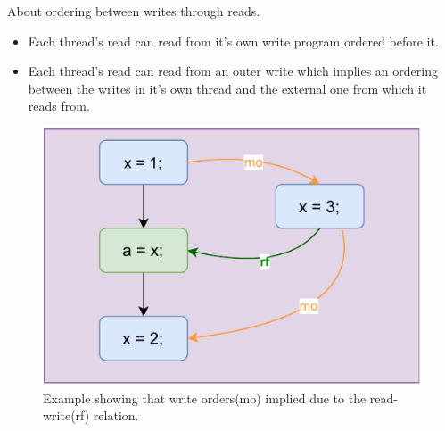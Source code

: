         About ordering between writes through reads. 
        \begin{itemize}
            \item Each thread's read can read from it's own write program ordered before it.
            \item Each thread's read can read from an outer write which implies an ordering between the writes in it's own thread and the external one from which it reads from. 
        \end{itemize}

        \begin{figure}[H]
            \centering
            \includegraphics[scale=0.7]{WriteOrderImplied.pdf}
            \caption{Example showing that write orders(mo) implied due to the read-write(rf) relation.}
        \end{figure}




























   
